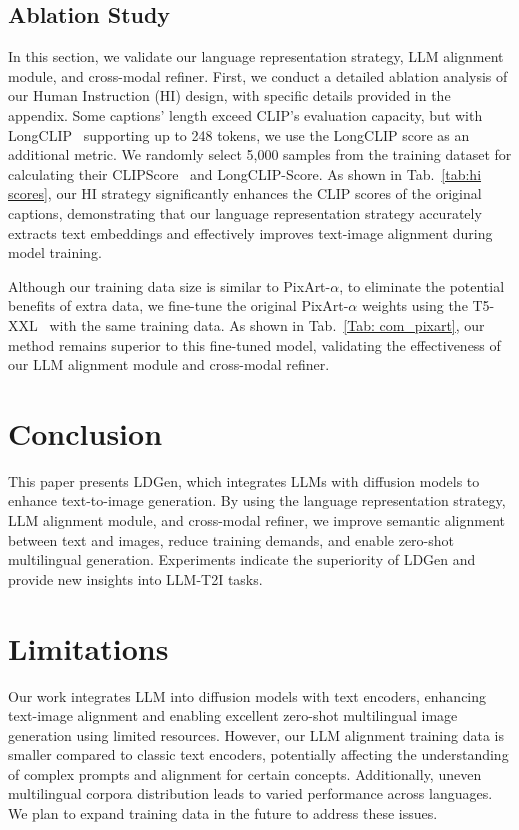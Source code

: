 \subsection{Ablation Study}



In this section, we validate our language representation strategy, LLM alignment module, and cross-modal refiner. First, we conduct a detailed ablation analysis of our Human Instruction (HI) design, with specific details provided in the appendix. Some captions' length exceed CLIP's evaluation capacity, but with LongCLIP~\cite{zhang2024long} supporting up to 248 tokens, we use the LongCLIP score as an additional metric. We randomly select 5,000 samples from the training dataset for calculating their CLIPScore~\cite{hessel2021clipscore} and LongCLIP-Score. As shown in Tab.~\ref{tab:hi scores}, our HI strategy significantly enhances the CLIP scores of the original captions, demonstrating that our language representation strategy accurately extracts text embeddings and effectively improves text-image alignment during model training.

Although our training data size is similar to PixArt-$\alpha$, to eliminate the potential benefits of extra data, we fine-tune the original PixArt-$\alpha$ weights using the T5-XXL~\cite{raffel2020exploring} with the same training data. As shown in Tab.~\ref{Tab: com_pixart}, our method remains superior to this fine-tuned model, validating the effectiveness of our LLM alignment module and cross-modal refiner.










\section{Conclusion}


This paper presents LDGen, which integrates LLMs with diffusion models to enhance text-to-image generation. By using the language representation strategy, LLM alignment module, and cross-modal refiner, we improve semantic alignment between text and images, reduce training demands, and enable zero-shot multilingual generation. Experiments indicate the superiority of LDGen and provide new insights into LLM-T2I tasks.



\section{Limitations}


Our work integrates LLM into diffusion models with text encoders, enhancing text-image alignment and enabling excellent zero-shot multilingual image generation using limited resources. However, our LLM alignment training data is smaller compared to classic text encoders, potentially affecting the understanding of complex prompts and alignment for certain concepts. Additionally, uneven multilingual corpora distribution leads to varied performance across languages. We plan to expand training data in the future to address these issues.